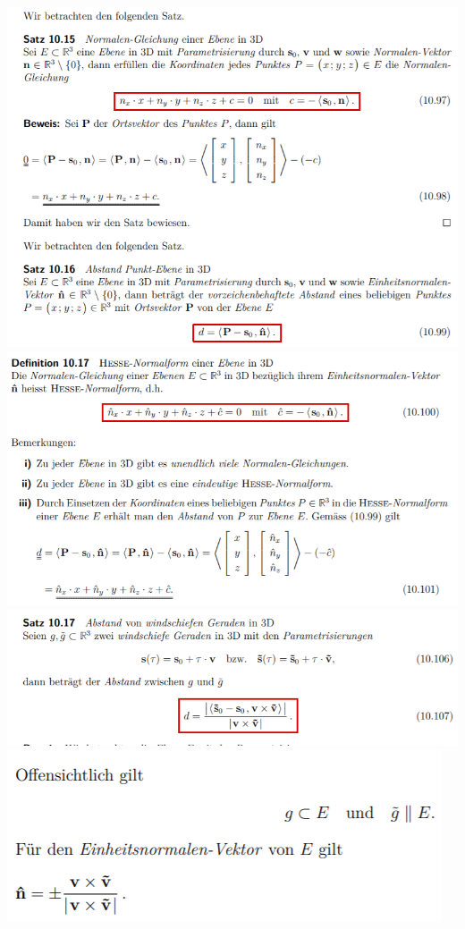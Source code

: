 \includegraphics[width=\columnwidth]{./images/vek32.png}
\includegraphics[width=\columnwidth]{./images/vek33.png}
\includegraphics[width=\columnwidth]{./images/vek34.png}
\includegraphics[width=\columnwidth]{./images/vek35.png}
